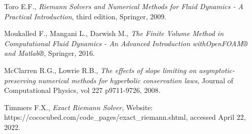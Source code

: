 \documentclass[10pt,letterpaper,notitlepage]{article}
\numberwithin{equation}{section}
\begin{document}
\newpage
\begin{thebibliography}{1}
	
	
	 Toro E.F., {\em Riemann Solvers and Numerical Methods for Fluid Dynamics - A Practical Introduction}, third edition, Springer, 2009.
	
	 Moukalled F.,  Mangani L., Darwish M., {\em The Finite Volume Method in Computational Fluid Dynamics - An Advanced Introduction withOpenFOAM® and Matlab®}, Springer, 2016.
	
	 McClarren R.G., Lowrie R.B., {\em The effects of slope limiting on asymptotic-preserving numerical methods for hyperbolic conservation laws}, Journal of Computational Physics, vol 227 p9711-9726, 2008.
	
	 Timmers F.X., {\em Exact Riemann Solver}, Website: https://cococubed.com/code\_pages/exact\_riemann.shtml, accessed April 22, 2022.
	
	   
\end{thebibliography}
\end{document}
